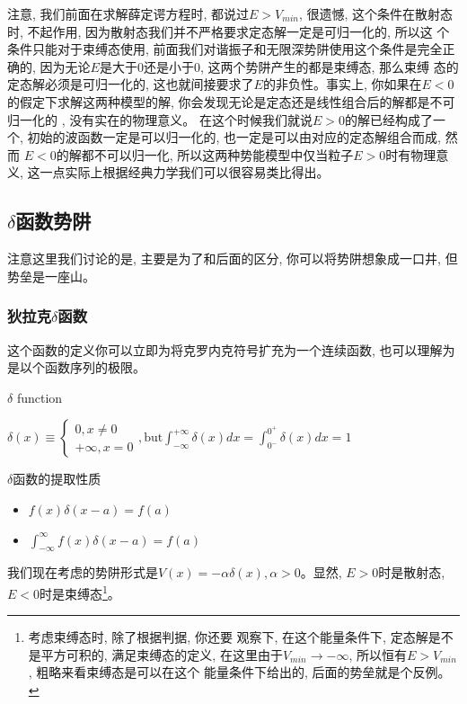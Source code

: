 \documentclass[a4paper,zihao=-4,linespread=1]{ctexrep}
\begin{document}
    注意, 我们前面在求解薛定谔方程时, 都说过$E>V_{min}$, 很遗憾, 这个条件在散射态时, 不起作用, 因为散射态我们并不严格要求定态解一定是可归一化的, 所以这
    个条件只能对于束缚态使用, 前面我们对谐振子和无限深势阱使用这个条件是完全正确的, 因为无论$E$是大于$0$还是小于$0$, 这两个势阱产生的都是束缚态, 那么束缚
    态的定态解必须是可归一化的, 这也就间接要求了$E$的非负性。事实上, 你如果在$E<0$的假定下求解这两种模型的解, 你会发现无论是定态还是线性组合后的解都是不可归一化的
    , 没有实在的物理意义。 在这个时候我们就说$E>0$的解已经构成了一个, 初始的波函数一定是可以归一化的, 也一定是可以由对应的定态解组合而成, 然而
    $E<0$的解都不可以归一化, 所以这两种势能模型中仅当粒子$E>0$时有物理意义, 这一点实际上根据经典力学我们可以很容易类比得出。

    \subsection{\texorpdfstring{$\delta$}d函数势阱}
    注意这里我们讨论的是, 主要是为了和后面的区分, 你可以将势阱想象成一口井, 但势垒是一座山。
    \subsubsection*{狄拉克$\delta$函数}
    这个函数的定义你可以立即为将克罗内克符号扩充为一个连续函数, 也可以理解为是以个函数序列的极限。
    \begin{define}{$\delta$ function}
        \begin{center}
            \begin{math}
                \displaystyle
                \delta(x)\equiv
                \begin{cases}
                    0, x\neq 0\\
                    +\infty,x=0
                \end{cases},\text{but}\int_{-\infty}^{+\infty}\delta(x) dx=\int_{0^-}^{0^+}\delta(x) dx=1
            \end{math}
        \end{center}
    \end{define}
    \begin{proposition}{$\delta$函数的提取性质}
        \begin{itemize}
            \item $f(x)\delta(x-a)=f(a)$
            \item $\int_{-\infty}^{\infty}f(x)\delta(x-a)=f(a)$
        \end{itemize}
    \end{proposition}
    我们现在考虑的势阱形式是$V(x)=-\alpha\delta(x),\alpha>0$。显然, $E>0$时是散射态, $E<0$时是束缚态\footnote[1]{考虑束缚态时, 除了根据判据, 你还要
    观察下, 在这个能量条件下, 定态解是不是平方可积的, 满足束缚态的定义, 在这里由于$V_{min}\to -\infty$, 所以恒有$E>V_{min}$, 粗略来看束缚态是可以在这个
    能量条件下给出的, 后面的势垒就是个反例。}。
\end{document}
